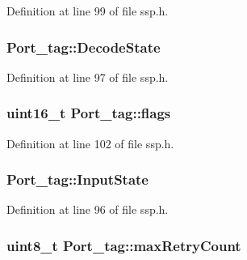 Definition at line 99 of file ssp.\-h.

\hypertarget{struct_port__tag_a727523e48966489e2ee78510203f9ee7}{
\subsubsection[{Decode\-State}]{ Port\-\_\-tag\-::\-Decode\-State}}\label{struct_port__tag_a727523e48966489e2ee78510203f9ee7}


Definition at line 97 of file ssp.\-h.

\hypertarget{struct_port__tag_a3ba36252e483d133c896772fa60d8d56}{
\subsubsection[{flags}]{\setlength{\rightskip}{0pt plus 5cm}uint16\-\_\-t Port\-\_\-tag\-::flags}}\label{struct_port__tag_a3ba36252e483d133c896772fa60d8d56}


Definition at line 102 of file ssp.\-h.

\hypertarget{struct_port__tag_a872ebb985531c08f3c00e12be31d101d}{
\subsubsection[{Input\-State}]{ Port\-\_\-tag\-::\-Input\-State}}\label{struct_port__tag_a872ebb985531c08f3c00e12be31d101d}


Definition at line 96 of file ssp.\-h.

\hypertarget{struct_port__tag_a799f4edb9ea6e89612826ece3bc84923}{
\subsubsection[{max\-Retry\-Count}]{\setlength{\rightskip}{0pt plus 5cm}uint8\-\_\-t Port\-\_\-tag\-::max\-Retry\-Count}}\label{struct_port__tag_a799f4edb9ea6e89612826ece3bc84923}


